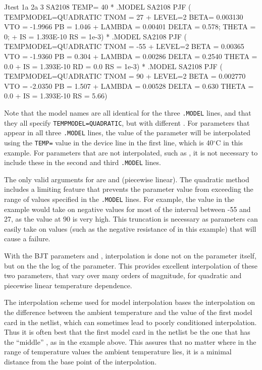 \begin{vquote}
Jtest 1a 2a 3 SA2108 TEMP= 40
*
.MODEL SA2108 PJF ( TEMPMODEL=QUADRATIC TNOM = 27
+ LEVEL=2 BETA= 0.003130 VTO = -1.9966 PB = 1.046
+ LAMBDA = 0.00401 DELTA = 0.578; THETA = 0;
+ IS = 1.393E-10          RS = 1e-3)
*
.MODEL SA2108 PJF ( TEMPMODEL=QUADRATIC TNOM = -55
+ LEVEL=2 BETA = 0.00365 VTO = -1.9360 PB = 0.304
+ LAMBDA = 0.00286 DELTA = 0.2540 THETA = 0.0
+ IS = 1.393E-10 RD = 0.0 RS = 1e-3)
* 
.MODEL SA2108 PJF ( TEMPMODEL=QUADRATIC TNOM = 90
+ LEVEL=2 BETA = 0.002770 VTO = -2.0350 PB = 1.507
+ LAMBDA = 0.00528 DELTA = 0.630 THETA = 0.0
+ IS = 1.393E-10          RS = 5.66)
\end{vquote}

Note that the model names are all identical for the three \texttt{.MODEL} lines,
and that they all specify \texttt{TEMPMODEL=QUADRATIC}, but with different
.  For parameters that appear in all three \texttt{.MODEL} lines,
the value of the parameter will be interpolated using the \texttt{TEMP=} value
in the device line in the first line, which is 40$^\circ$C in this example.
For parameters that are not interpolated, such as , it is not
necessary to include these in the second and third \texttt{.MODEL} lines.

The only valid arguments for  are  and
 (piecewise linear).  The quadratic method includes a limiting
feature that prevents the parameter value from exceeding the range of values
specified in the \texttt{.MODEL} lines.  For example, the  value in
the example would take on negative values for most of the interval between -55
and 27, as the value at 90 is very high.  This truncation is necessary as
parameters can easily take on values (such as the negative resistance of
 in this example) that will cause a \Xyce{} failure.

With the BJT parameters  and , interpolation is done
not on the parameter itself, but on the the log of the parameter.  This
provides excellent interpolation of these two parameters, that vary over
many orders of magnitude, for quadratic and piecewise linear
temperature dependence.

The interpolation scheme used for model interpolation bases the interpolation
on the difference between the ambient temperature and the  value
of the first model card in the netlist, which can sometimes lead to poorly
conditioned interpolation.  Thus it is often best that the first model card in
the netlist be the one that has the ``middle'' , as in the example
above.  This assures that no matter where in the range of temperature values
the ambient temperature lies, it is a minimal distance from the base point of
the interpolation.

